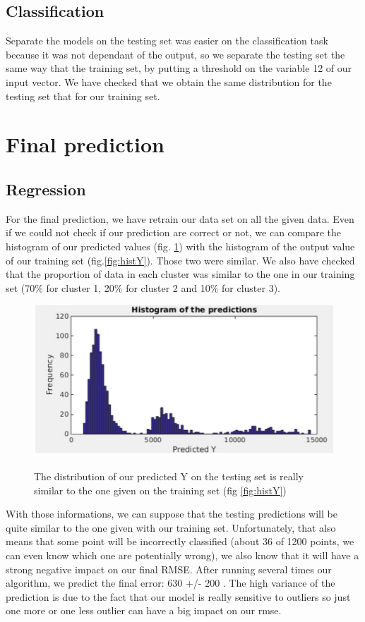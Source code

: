 \documentclass{article} %
\begin{document}
\subsection{Classification}

Separate the models on the testing set was easier on the classification task because it was not dependant of the output, so we separate the testing set the same way that the training set, by putting a threshold on the variable 12 of our input vector. We have checked that we obtain the same distribution for the testing set that for our training set.

\section{Final prediction}

\subsection{Regression}

For the final prediction, we have retrain our data set on all the given data. Even if we could not check if our prediction are correct or not, we can compare the histogram of our predicted values (fig. \ref{fig:histPredY}) with the histogram of the output value of our training set (fig.\ref{fig:histY}). Those two were similar. We also have checked that the proportion of data in each cluster was similar to the one in our training set (70\% for cluster 1, 20\% for cluster 2 and 10\% for cluster 3).

\begin{figure}[!h]
\center
{\includegraphics{figures/histPredY.png} \label{fig:histPredY}}
\caption{The distribution of our predicted Y on the testing set is really similar to the one given on the training set (fig \ref{fig:histY})}
\end{figure}

With those informations, we can suppose that the testing predictions will be quite similar to the one given with our training set. Unfortunately, that also means that some point will be incorrectly classified (about 36 of 1200 points, we can even know which one are potentially wrong), we also know that it will have a strong negative impact on our final RMSE. After running several times our algorithm, we predict the final error: 630 +/- 200 . The high variance of the prediction is due to the fact that our model is really sensitive to outliers so just one more or one less outlier can have a big impact on our rmse.
\end{document}
